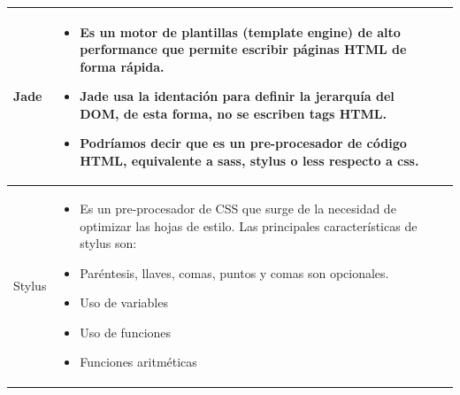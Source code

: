 \newpage
\begin{table}[b!]
\centering
\begin{tabular}{|p{2cm}|ll}
        \hline
          \multicolumn{1}{|p{5cm}|}{Jade}& 
          \multicolumn{1}{p{10cm}|}{
          \begin{itemize}
          \vspace{5mm}
          \item Es un motor de plantillas (template engine) de alto performance
              que permite escribir páginas HTML de forma rápida.
        \item Jade usa la identación para definir la jerarquía del DOM, de esta
              forma, no se escriben tags HTML.
        \item Podríamos decir que es un pre-procesador de código HTML, equivalente a sass, stylus o less respecto a css.
      \end{itemize}} \\
\hline
            \multicolumn{1}{|p{5cm}|}{Stylus}& 
          \multicolumn{1}{p{10cm}|}{
          \begin{itemize}
          \vspace{10mm}
          \item Es un pre-procesador de CSS que surge de la necesidad de optimizar
              las hojas de estilo.
        Las principales características de stylus son:              
        \item Paréntesis, llaves, comas, puntos y comas son opcionales.
        \item Uso de variables
        \item Uso de funciones
        \item Funciones aritméticas
      \end{itemize}} \\
      \hline
      \end{tabular}
    \end{table}

